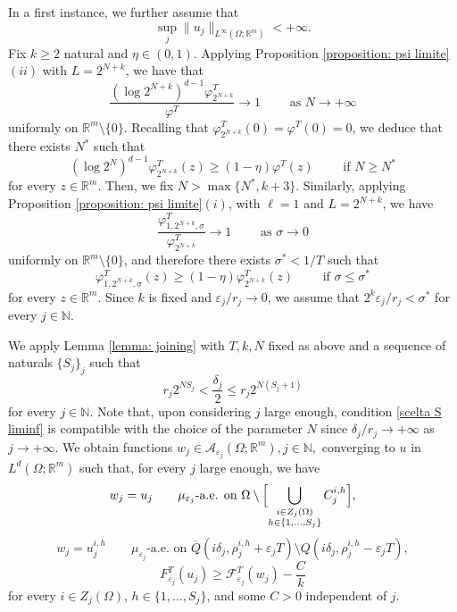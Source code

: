 \documentclass{article}
\theoremstyle{plain}
\theoremstyle{definition}
\def\rr{{\mathbb R}}
\def\NN{{\mathbb N}}
\newcommand{\f}{\varphi}
\newcommand{\ej}{\varepsilon_j}
\newcommand{\rj}{r_j}
\newcommand{\s}{\sigma}
\newcommand{\dej}{\delta_j}
\newcommand{\F}{\mathcal{F}}
\numberwithin{equation}{section}
\begin{document}
In a first instance, we further assume that 
\begin{equation}\label{ipotesi: succ limitata}
    \sup_j \|u_j\|_{L^\infty(\Omega;\rr^m)}<+\infty.
\end{equation}
Fix $k\geq2$ natural and $\eta\in(0,1)$. Applying Proposition \ref{proposition: psi limite}$(ii)$ with $L=2^{N+k}$, we have that
\begin{equation*}
    \frac{(\log 2^{N+k})^{d-1} \f^T_{2^{N+k}}}{\f^T}\to 1 \qquad \text{ as }N\to+\infty
\end{equation*}
uniformly on $\rr^m\setminus\{0\}$. Recalling that $\f^T_{2^{N+k}}(0)=\f^T(0)=0$, we deduce that there exists $N^*$ such that
\begin{equation}\label{scelta N liminf}
   (\log 2^N)^{d-1}\f^T_{2^{N+k}}(z)\geq(1-\eta)\f^T(z) \qquad \text{ if } N\geq N^*
\end{equation}
for every $z\in \rr^m$. Then, we fix $N>\max\{N^*,k+3\}$. Similarly, applying Proposition \ref{proposition: psi limite}$(i)$, with $\ell=1$ and $L=2^{N+k}$, we have
\begin{equation*}
    \frac{\f^T_{1,2^{N+k},\s}}{\f^T_{2^{N+k}}}\to1 \qquad \text{ as }\s\to0
\end{equation*}
uniformly on $\rr^m\setminus\{0\}$, and therefore there exists $\s^*<1/T$ such that
\begin{equation}\label{scelta j liminf}
    \f^T_{1,2^{N+k},\s}(z)\geq (1-\eta)\f^T_{2^{N+k}}(z) \qquad \text{ if } \s\leq \s^*
\end{equation}
for every $z\in \rr^m$. Since $k$ is fixed and $\ej/\rj\to0$, we assume that $2^k\ej/\rj<\s^*$ for every $j\in\NN$.

We apply Lemma \ref{lemma: joining} with $T,k,N$ fixed as above and a sequence of naturals $\{S_j\}_j$ such that \begin{equation}\label{scelta S liminf}
    \rj2^{NS_j}< \frac{\dej}{2}\leq\rj2^{N(S_j+1)}
\end{equation}
for every $j\in\NN$. Note that, upon considering $j$ large enough, condition \eqref{scelta S liminf} is compatible with the choice of the parameter $N$ since $\dej/\rj\to+\infty$ as $j\to+\infty$. We obtain functions $w_{j}\in \mathcal{A}_{\varepsilon_{j}}(\Omega;\mathbb{R}^{m}), j\in\NN,$  converging to $u$ in $L^d(\Omega; \rr^m)$ such that, for every $j$ large enough, we have
\begin{equation}\label{liminf-outcornici}
    w_{j}=u_{j} \qquad \mu_{\ej} \text{-a.e. on } \Omega\setminus \Bigl[ \bigcup_{\substack{i \in Z_{j}(\Omega)\\ h\in\{1,\dots, S_j\}}}C_{j}^{i,h}\Bigr],
\end{equation}
\begin{equation}\label{liminf-bordointerno}
    w_{j}=u_{j}^{i, h} \qquad \mu_{\ej} \text{-a.e. on }\overline{Q}(i\delta_j,\rho^{i,h}_{j}+\varepsilon_j T)\setminus Q(i\delta_j,\rho^{i, h}_{j}-\varepsilon_j T),
\end{equation}
\begin{equation}\label{liminf-diffenergia}
    F^T_{\ej}(u_j)\geq \F^T_{\ej}(w_j)- \frac{C}{k}
\end{equation}
for every $i\in Z_j(\Omega)$, $h\in\{1,\dots,S_j\}$, and some $C>0$ independent of $j$. 
\end{document}
